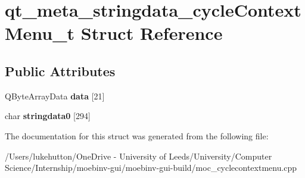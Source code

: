 \hypertarget{structqt__meta__stringdata__cycle_context_menu__t}{}\section{qt\+\_\+meta\+\_\+stringdata\+\_\+cycle\+Context\+Menu\+\_\+t Struct Reference}
\label{structqt__meta__stringdata__cycle_context_menu__t}
\subsection*{Public Attributes}
\begin{DoxyCompactItemize}
\item 
\mbox{\label{structqt__meta__stringdata__cycle_context_menu__t_a5d7c8abf7959a17b83d045f9ad7b4c2a}} 
Q\+Byte\+Array\+Data {\bfseries data} \mbox{[}21\mbox{]}
\item 
\mbox{\label{structqt__meta__stringdata__cycle_context_menu__t_a51ea2171aa6b87941882cb7be4d61db8}} 
char {\bfseries stringdata0} \mbox{[}294\mbox{]}
\end{DoxyCompactItemize}


The documentation for this struct was generated from the following file\+:\begin{DoxyCompactItemize}
\item 
/\+Users/lukehutton/\+One\+Drive -\/ University of Leeds/\+University/\+Computer Science/\+Internship/moebinv-\/gui/moebinv-\/gui-\/build/moc\+\_\+cyclecontextmenu.\+cpp\end{DoxyCompactItemize}
